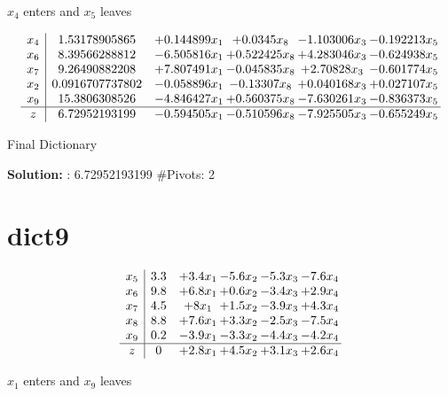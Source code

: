 \documentclass[10pt]{article}
\begin{document}
 $ x_{4} $ enters and $ x_{5} $ leaves 

 \[\begin{array}{c| c c@{\hskip 2pt} c@{\hskip 2pt} c@{\hskip 2pt} c@{\hskip 2pt} }
 x_{4}   &  1.53178905865 & + 0.144899 x_{1} & + 0.0345 x_{8} & -1.103006 x_{3} & -0.192213 x_{5}\\
 x_{6}   &  8.39566288812 & -6.505816 x_{1} & + 0.522425 x_{8} & + 4.283046 x_{3} & -0.624938 x_{5}\\
 x_{7}   &  9.26490882208 & + 7.807491 x_{1} & -0.045835 x_{8} & + 2.70828 x_{3} & -0.601774 x_{5}\\
 x_{2}   &  0.0916707737802 & -0.058896 x_{1} & -0.13307 x_{8} & + 0.040168 x_{3} & + 0.027107 x_{5}\\
 x_{9}   &  15.3806308526 & -4.846427 x_{1} & + 0.560375 x_{8} & -7.630261 x_{3} & -0.836373 x_{5}\\
\hline
z    &  6.72952193199 & -0.594505 x_{1} & -0.510596 x_{8} & -7.925505 x_{3} & -0.655249 x_{5}\\
\end{array}\]


 Final Dictionary
\par \noindent\textbf{Solution:} :  6.72952193199
\#Pivots:  2
\section{dict9}

\[\begin{array}{c| c c@{\hskip 2pt} c@{\hskip 2pt} c@{\hskip 2pt} c@{\hskip 2pt} }
 x_{5}   &  3.3 & + 3.4 x_{1} & -5.6 x_{2} & -5.3 x_{3} & -7.6 x_{4}\\
 x_{6}   &  9.8 & + 6.8 x_{1} & + 0.6 x_{2} & -3.4 x_{3} & + 2.9 x_{4}\\
 x_{7}   &  4.5 & + 8  x_{1} & + 1.5 x_{2} & -3.9 x_{3} & + 4.3 x_{4}\\
 x_{8}   &  8.8 & + 7.6 x_{1} & + 3.3 x_{2} & -2.5 x_{3} & -7.5 x_{4}\\
 x_{9}   &  0.2 & -3.9 x_{1} & -3.3 x_{2} & -4.4 x_{3} & -4.2 x_{4}\\
\hline
z    &  0 & + 2.8 x_{1} & + 4.5 x_{2} & + 3.1 x_{3} & + 2.6 x_{4}\\
\end{array}\]


 $ x_{1} $ enters and $ x_{9} $ leaves 
\end{document}
